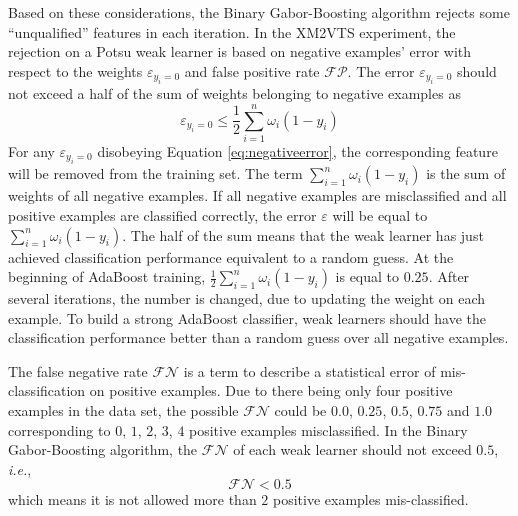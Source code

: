 Based on these considerations, the Binary Gabor-Boosting algorithm rejects some ``unqualified'' features in each iteration. In the \mbox{XM2VTS} experiment, the rejection on a Potsu weak learner is based on negative examples' error with respect to the weights $\varepsilon_{y_i=0}$ and false positive rate $\mathcal{FP}$. The error $\varepsilon_{y_i=0}$ should not exceed a half of the sum of weights belonging to negative examples as
\begin{equation}\label{eq:negativeerror}
 \varepsilon_{y_i=0} \le \frac{1}{2}\sum_{i=1}^{n}\omega_{i}(1-y_{i})
\end{equation}
For any $\varepsilon_{y_i=0}$ disobeying \mbox{Equation} \ref{eq:negativeerror}, the corresponding feature will be removed from the training set. The term $\sum_{i=1}^{n}\omega_{i}(1-y_{i})$ is the sum of weights of all negative examples. If all negative examples are misclassified and all positive examples are classified correctly, the error $\varepsilon$ will be equal to $\sum_{i=1}^{n}\omega_{i}(1-y_{i})$. The half of the sum means that the weak learner has just achieved classification performance equivalent to a random guess. At the beginning of AdaBoost training, $\frac{1}{2}\sum_{i=1}^{n}\omega_{i}(1-y_{i})$ is equal to $0.25$. After several iterations, the number is changed, due to updating the weight on each example. To build a strong AdaBoost classifier, weak learners should have the classification performance better than a random guess over all negative examples.

The false negative rate $\mathcal{FN}$ is a term to describe a statistical error of mis-classification on positive examples. Due to there being only four positive examples in the data set, the possible $\mathcal{FN}$ could be $0.0$, $0.25$, $0.5$, $0.75$ and $1.0$ corresponding to $0$, $1$, $2$, $3$, $4$ positive examples misclassified. In the Binary Gabor-Boosting algorithm, the $\mathcal{FN}$ of each weak learner should not exceed $0.5$, \textit{i.e.},
\begin{equation}
 \mathcal{FN} < 0.5
\end{equation}
which means it is not allowed more than $2$ positive examples mis-classified.

